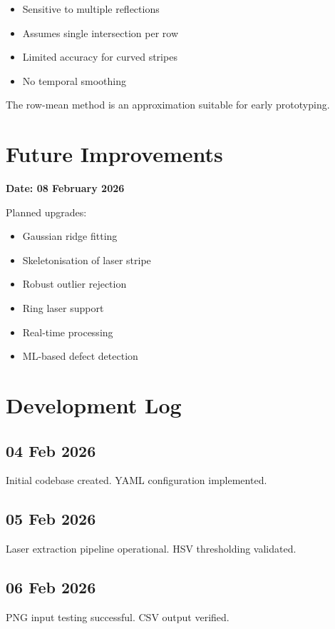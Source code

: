 \documentclass[11pt,a4paper]{article}
\begin{document}
\begin{itemize}
  \item Sensitive to multiple reflections
  \item Assumes single intersection per row
  \item Limited accuracy for curved stripes
  \item No temporal smoothing
\end{itemize}

The row-mean method is an approximation suitable for early prototyping.

\section{Future Improvements}

\textbf{Date: 08 February 2026}

Planned upgrades:

\begin{itemize}
  \item Gaussian ridge fitting
  \item Skeletonisation of laser stripe
  \item Robust outlier rejection
  \item Ring laser support
  \item Real-time processing
  \item ML-based defect detection
\end{itemize}

\section{Development Log}

\subsection*{04 Feb 2026}
Initial codebase created. YAML configuration implemented.

\subsection*{05 Feb 2026}
Laser extraction pipeline operational. HSV thresholding validated.

\subsection*{06 Feb 2026}
PNG input testing successful. CSV output verified.
\end{document}
